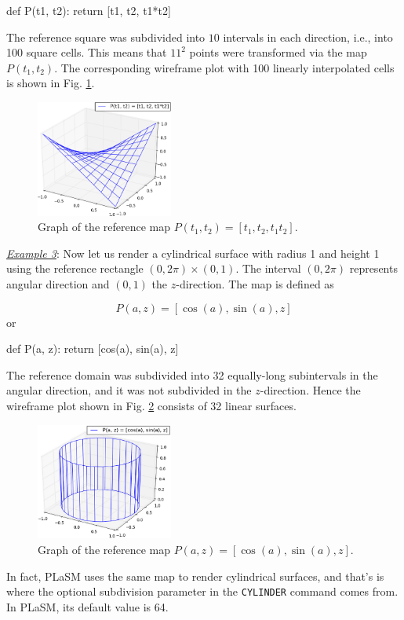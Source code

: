 \begin{bbox}
def P(t1, t2):
    return [t1, t2, t1*t2]
\end{bbox}
The reference square was subdivided into $10$ intervals in each direction, i.e., into 
100 square cells. This means that $11^2$ points were transformed via the map $P(t_1, t_2)$.
The corresponding wireframe plot with 100 linearly interpolated cells is shown in Fig. \ref{fig:paramsu1c}. 

\begin{figure}[!ht]
\begin{center}
\includegraphics[width=0.4\textwidth]{img/paramsu1c.png}
\end{center}
\vspace{-6mm}
\caption{Graph of the reference map $P(t_1, t_2) = [t_1, t_2, t_1 t_2]$.}
\label{fig:paramsu1c}
\end{figure}
\noindent
\noindent
\underline{\em Example 3}: Now let us render a cylindrical surface 
with radius 1 and height 1 using the reference rectangle $(0, 2\pi)\times(0, 1)$. 
The interval $(0, 2\pi)$ represents angular direction and $(0, 1)$ the $z$-direction. 
The map is defined as

$$
P(a, z) = [\cos(a), \sin(a), z]
$$
or

\begin{bbox}
def P(a, z):
    return [cos(a), sin(a), z]
\end{bbox}
The reference domain was subdivided into 32 equally-long subintervals in the angular direction,
and it was not subdivided in the $z$-direction. Hence the wireframe plot shown in 
Fig. \ref{fig:paramsu20} consists of 32 linear surfaces. 
\newpage
\begin{figure}[!ht]
\begin{center}
\includegraphics[width=0.4\textwidth]{img/paramsu20.png}
\end{center}
\vspace{-6mm}
\caption{Graph of the reference map $P(a, z) = [\cos(a), \sin(a), z]$.}
\label{fig:paramsu20}
\end{figure}
\noindent
In fact, PLaSM uses the same map to render cylindrical surfaces, and that's
is where the optional subdivision parameter in the {\tt CYLINDER} command comes from.
In PLaSM, its default value is 64. 

